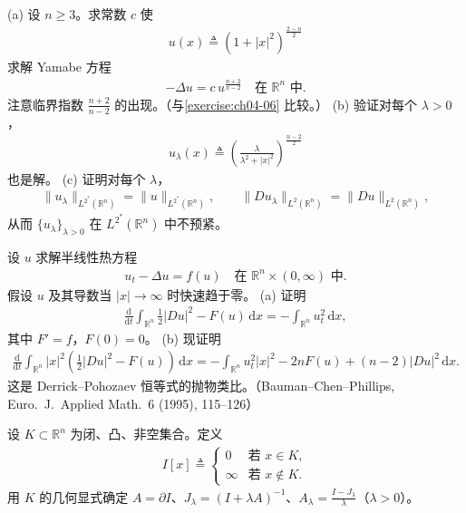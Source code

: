 \documentclass[../../main.tex]{subfiles}
\begin{document}
\begin{exercise}[解的非紧族]\label{exercise:ch09-7-8}
(a) 设 $n\geqslant 3$。求常数 $c$ 使
\begin{align*}
u(x)\triangleq(1+|x|^2)^{\frac{2-n}{2}}
\end{align*}
求解 Yamabe 方程
\begin{align*}
-\Delta u=c\,u^{\frac{n+2}{n-2}}\quad\text{在 }\mathbb{R}^n\text{ 中}.
\end{align*}
注意临界指数 $\frac{n+2}{n-2}$ 的出现。（与\cref{exercise:ch04-06} 比较。）
(b) 验证对每个 $\lambda>0$，
\begin{align*}
u_\lambda(x)\triangleq\left(\frac\lambda{\lambda^2+|x|^2}\right)^{\frac{n-2}{2}}
\end{align*}
也是解。
(c) 证明对每个 $\lambda$，
\begin{align*}
\|u_\lambda\|_{L^{2^*}(\mathbb{R}^n)}=\|u\|_{L^{2^*}(\mathbb{R}^n)},\qquad \|Du_\lambda\|_{L^2(\mathbb{R}^n)}=\|Du\|_{L^2(\mathbb{R}^n)},
\end{align*}
从而 $\{u_\lambda\}_{\lambda>0}$ 在 $L^{2^*}(\mathbb{R}^n)$ 中不预紧。
\end{exercise}

\begin{exercise}\label{exercise:ch09-7-9}
设 $u$ 求解半线性热方程
\begin{align*}
u_t-\Delta u=f(u)\quad\text{在 }\mathbb{R}^n\times(0,\infty)\text{ 中}.
\end{align*}
假设 $u$ 及其导数当 $|x|\to\infty$ 时快速趋于零。
(a) 证明
\begin{align*}
\frac{\mathrm{d}}{\mathrm{d}t}\int_{\mathbb{R}^n}\frac12|Du|^2-F(u)\,\mathrm{d}x=-\int_{\mathbb{R}^n}u_t^2\,\mathrm{d}x,
\end{align*}
其中 $F'=f$，$F(0)=0$。
(b) 现证明
\begin{align*}
\frac{\mathrm{d}}{\mathrm{d}t}\int_{\mathbb{R}^n}|x|^2\left(\frac12|Du|^2-F(u)\right)\,\mathrm{d}x=-\int_{\mathbb{R}^n}u_t^2|x|^2-2nF(u)+(n-2)|Du|^2\,\mathrm{d}x.
\end{align*}
这是 Derrick--Pohozaev 恒等式的抛物类比。（Bauman--Chen--Phillips, Euro.\ J.\ Applied Math.\ 6 (1995), 115--126）
\end{exercise}

\begin{exercise}\label{exercise:ch09-7-10}
设 $K\subset\mathbb{R}^n$ 为闭、凸、非空集合。定义
\begin{align*}
I[x]\triangleq\begin{cases}0&\text{若 }x\in K,\\ \infty&\text{若 }x\notin K.\end{cases}
\end{align*}
用 $K$ 的几何显式确定 $A=\partial I$、$J_\lambda=(I+\lambda A)^{-1}$、$A_\lambda=\frac{I-J_\lambda}{\lambda}$（$\lambda>0$）。
\end{exercise}
\end{document}
